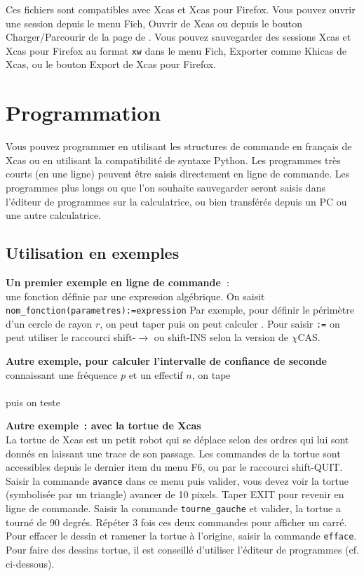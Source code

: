 \documentclass{article}
\begin{document}
\begin{giacjshere}
Ces fichiers sont compatibles avec Xcas et Xcas pour Firefox. Vous
pouvez ouvrir une session depuis le menu Fich, Ouvrir de Xcas
ou depuis le bouton Charger/Parcourir de la page de 
.
Vous pouvez sauvegarder des sessions Xcas et Xcas pour Firefox au format
\verb|xw| dans le menu Fich, Exporter comme Khicas de Xcas, 
ou le bouton Export de Xcas pour Firefox.



\section{Programmation}
Vous pouvez programmer en utilisant
les structures de commande en fran\c{c}ais de Xcas
ou en utilisant la compatibilit\'e de
syntaxe Python. Les programmes tr\`es courts (en une ligne)
peuvent \^etre saisis directement en ligne de commande. Les
programmes plus longs ou que l'on souhaite sauvegarder
seront saisis dans l'\'editeur de programmes sur
la calculatrice, ou bien transf\'er\'es depuis un PC ou
une autre calculatrice.

\subsection{Utilisation en exemples}
{\bf Un premier exemple en ligne de commande~}:\\
une fonction d\'efinie par une expression alg\'ebrique. On
saisit \verb|nom_fonction(parametres):=expression|
Par exemple, pour d\'efinir le p\'erim\`etre d'un cercle de
rayon $r$, on peut taper
puis on peut calculer .
Pour saisir \verb|:=| on peut utiliser le raccourci
shift-$\rightarrow$ ou shift-INS selon la version de $\chi$CAS.

{\bf Autre exemple, pour calculer l'intervalle de confiance de seconde}
connaissant une fr\'equence $p$ et un effectif $n$, on tape\\
\\
puis on teste 

{\bf Autre exemple~: avec la tortue de Xcas}\\
La tortue de Xcas est un petit robot qui se d\'eplace selon des 
ordres qui lui sont donn\'es en laissant une trace de son passage.
Les commandes de la tortue sont accessibles depuis le dernier item
du menu F6, ou par le raccourci shift-QUIT.
Saisir la commande {\tt avance} dans ce menu puis valider, vous
devez voir la tortue (symbolis\'ee par un triangle) avancer de 10 pixels.
Taper EXIT pour revenir en ligne de commande.
Saisir la commande \verb|tourne_gauche| et valider, la tortue a tourn\'e
de 90 degr\'es. R\'ep\'eter
3 fois ces deux commandes pour afficher un carr\'e.\\
Pour effacer le dessin et ramener la tortue \`a l'origine,
saisir la commande {\tt efface}.
Pour faire des dessins tortue, il est conseill\'e d'utiliser l'\'editeur
de programmes (cf. ci-dessous).


\end{giacjshere}
\end{document}

